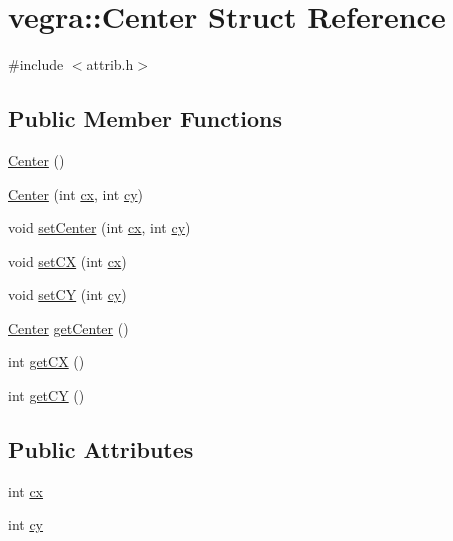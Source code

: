 \hypertarget{structvegra_1_1Center}{}\section{vegra\+:\+:Center Struct Reference}
\label{structvegra_1_1Center}


{\ttfamily \#include $<$attrib.\+h$>$}

\subsection*{Public Member Functions}
\begin{DoxyCompactItemize}
\item 
\mbox{\hyperlink{structvegra_1_1Center_aba154fa620d3887422c314862d6d945d}{Center}} ()
\item 
\mbox{\hyperlink{structvegra_1_1Center_a9431449d3f25bb9fccba76772aef273a}{Center}} (int \mbox{\hyperlink{structvegra_1_1Center_a336735442bd468d062343de6329771e7}{cx}}, int \mbox{\hyperlink{structvegra_1_1Center_a2dab1c0677aaf7d4c13922cbd8c19a0b}{cy}})
\item 
void \mbox{\hyperlink{structvegra_1_1Center_af3a177676cb43cfe8a9ad3f2a7f8b1ed}{set\+Center}} (int \mbox{\hyperlink{structvegra_1_1Center_a336735442bd468d062343de6329771e7}{cx}}, int \mbox{\hyperlink{structvegra_1_1Center_a2dab1c0677aaf7d4c13922cbd8c19a0b}{cy}})
\item 
void \mbox{\hyperlink{structvegra_1_1Center_a89d748223c30728ca26907a974ba1a90}{set\+CX}} (int \mbox{\hyperlink{structvegra_1_1Center_a336735442bd468d062343de6329771e7}{cx}})
\item 
void \mbox{\hyperlink{structvegra_1_1Center_a0d726648f4ab1ea9bbcbd43ee0248e52}{set\+CY}} (int \mbox{\hyperlink{structvegra_1_1Center_a2dab1c0677aaf7d4c13922cbd8c19a0b}{cy}})
\item 
\mbox{\hyperlink{structvegra_1_1Center}{Center}} \mbox{\hyperlink{structvegra_1_1Center_a70731af46bc0f1fb16a5a75027b51105}{get\+Center}} ()
\item 
int \mbox{\hyperlink{structvegra_1_1Center_af84451bd070b1624531137eca020a920}{get\+CX}} ()
\item 
int \mbox{\hyperlink{structvegra_1_1Center_a9e2b54760c6b262fd47679480f4ac77d}{get\+CY}} ()
\end{DoxyCompactItemize}
\subsection*{Public Attributes}
\begin{DoxyCompactItemize}
\item 
int \mbox{\hyperlink{structvegra_1_1Center_a336735442bd468d062343de6329771e7}{cx}}
\item 
int \mbox{\hyperlink{structvegra_1_1Center_a2dab1c0677aaf7d4c13922cbd8c19a0b}{cy}}
\end{DoxyCompactItemize}


